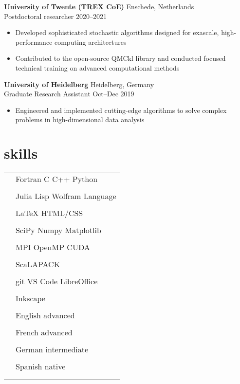 \documentclass[12pt]{article}
\newcommand{\entry}[4]{{{\textbf{#1}}} \hfill #3 \\ #2 \hfill #4}
\newcommand{\tableentry}[3]{\textsc{#1} & #2\expandafter\ifstrequal\expandafter{#3}{}{\\}{\\[6pt]}}
\begin{document}
\begin{paracol}{2}
    \medskip

    \entry{University of Twente (TREX CoE)}{Postdoctoral researcher}{Enschede, Netherlands}{2020--2021}
    \begin{itemize}[noitemsep,leftmargin=3.5mm,rightmargin=0mm,topsep=6pt]
    \item Developed sophisticated stochastic algorithms designed for exascale, high-performance computing architectures
    \item Contributed to the open-source QMCkl library and conducted focused technical training on advanced computational methods
    \end{itemize}

    \medskip

    \entry{University of Heidelberg}{Graduate Research Assistant}{Heidelberg, Germany}{Oct--Dec 2019}
    \begin{itemize}[noitemsep,leftmargin=3.5mm,rightmargin=0mm,topsep=6pt]
    \item Engineered and implemented cutting-edge algorithms to solve complex problems in high-dimensional data analysis
    \end{itemize}

    \switchcolumn{}

    \section{skills}
    \begin{supertabular}{rl}
      \tableentry{\footnotesize\faCode}{Fortran \textperiodcentered{} C
        \textperiodcentered{} C++ \textperiodcentered{} Python}{}
      \tableentry{}{Julia \textperiodcentered{} Lisp \textperiodcentered{} Wolfram Language}{}
      \tableentry{}{LaTeX \textperiodcentered{} HTML/CSS}{}
      \tableentry{\footnotesize\faCogs}{SciPy \textperiodcentered{} Numpy \textperiodcentered{} Matplotlib}{}
      \tableentry{}{MPI \textperiodcentered{} OpenMP \textperiodcentered{} CUDA}{}
      \tableentry{}{ScaLAPACK}{}
      \tableentry{\footnotesize\faLaptop}{git \textperiodcentered{} VS Code \textperiodcentered{} LibreOffice}{}
      \tableentry{}{Inkscape}{}

      \tableentry{\footnotesize\faLanguage}{English \textperiodcentered{} advanced}{}
      \tableentry{}{French \textperiodcentered{} advanced}{}
      \tableentry{}{German \textperiodcentered{} intermediate}{}
      \tableentry{}{Spanish \textperiodcentered{} native}{}
    \end{supertabular}


\end{paracol}
\end{document}
